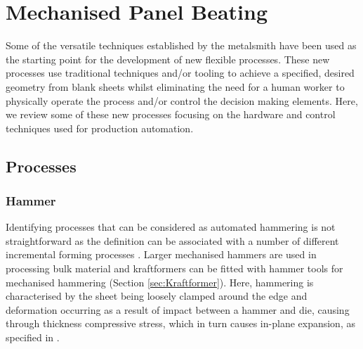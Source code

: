 


\newpage
\section{Mechanised Panel Beating} \label{sec:Mechanised}

Some of the versatile techniques established by the metalsmith have been used as the starting point for the development of new flexible processes. These new processes use traditional techniques and/or tooling to achieve a specified, desired geometry from blank sheets whilst eliminating the need for a human worker to physically operate the process and/or control the decision making elements.  Here, we review some of these new processes focusing on the hardware and control techniques used for production automation.

\subsection{Processes} \label{sec:MechanisedProcess}
\subsubsection*{Hammer}
Identifying processes that can be considered as automated hammering is not straightforward as the definition can be associated with a number of different incremental forming processes \citep{Emmens2010TheHistory}. Larger mechanised hammers are used in processing bulk material \citep{Lange1986HandbookForming} and kraftformers can be fitted with hammer tools for mechanised hammering (Section \ref{sec:Kraftformer}). Here, hammering is characterised by the sheet being loosely clamped around the edge and deformation occurring as a result of impact between a hammer and die, causing through thickness compressive stress, which in turn causes in-plane expansion, as specified in \citep{Allwood2006AJapan}. %


